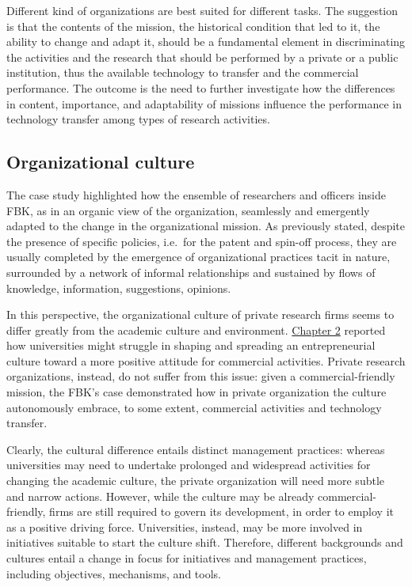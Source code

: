 Different kind of organizations are best suited for different tasks. The suggestion is that the contents of the mission, the historical condition that led to it, the ability to change and adapt it, should be a fundamental element in discriminating the activities and the research that should be performed by a private or a public institution, thus the available technology to transfer and the commercial performance. The outcome is the need to further investigate how the differences in content, importance, and adaptability of missions influence the performance in technology transfer among types of research activities.

\subsection{Organizational culture}

The case study highlighted how the ensemble of researchers and officers inside FBK, as in an organic view of the organization, seamlessly and emergently adapted to the change in the organizational mission. As previously stated, despite the presence of specific policies, i.e.\ for the patent and spin-off process, they are usually completed by the emergence of organizational practices tacit in nature, surrounded by a network of informal relationships and sustained by flows of knowledge, information, suggestions, opinions. 

In this perspective, the organizational culture of private research firms seems to differ greatly from the academic culture and environment. \hyperref[Chapter2]{Chapter 2} reported how universities might struggle in shaping and spreading an entrepreneurial culture toward a more positive attitude for commercial activities. Private research organizations, instead, do not suffer from this issue: given a commercial-friendly mission, the FBK's case demonstrated how in private organization the culture autonomously embrace, to some extent, commercial activities and technology transfer. 

Clearly, the cultural difference entails distinct management practices: whereas universities may need to undertake prolonged and widespread activities for changing the academic culture, the private organization will need more subtle and narrow actions. However, while the culture may be already commercial-friendly, firms are still required to govern its development, in order to employ it as a positive driving force. Universities, instead, may be more involved in initiatives suitable to start the culture shift. Therefore, different backgrounds and cultures entail a change in focus for initiatives and management practices, including objectives, mechanisms, and tools.

